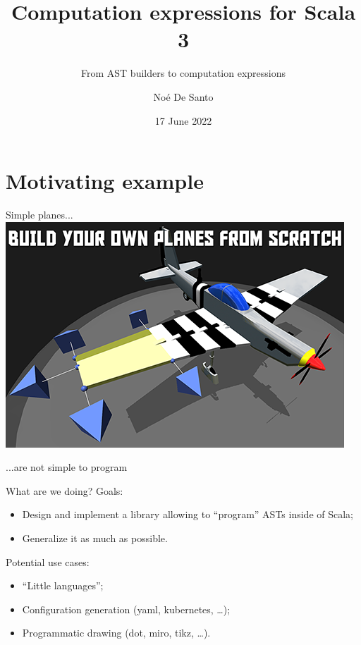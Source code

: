 \documentclass{beamer}
\author{Noé De Santo}
\title{Computation expressions for Scala 3}
\subtitle{From AST builders to computation expressions}
\date{17 June 2022}
\begin{document}
    \maketitle

    \section{Motivating example}

    \begin{frame}{Simple planes...}
        \includegraphics[width=\textwidth]{figs/simple_planes.png}
    \end{frame}

    \begin{frame}{...are not simple to program}
        
        \vspace{2em}
        \pause
        
    \end{frame}

    \begin{frame}{What are we doing?}
        Goals:
        \begin{itemize}
            \item Design and implement a library allowing to ``program'' ASTs inside of Scala;
            \item Generalize it as much as possible.
        \end{itemize}

        \pause
        Potential use cases:
        \begin{itemize}
            \item ``Little languages'';
            \item Configuration generation (yaml, kubernetes, \ldots{});
            \item Programmatic drawing (dot, miro, tikz, \ldots{}).
        \end{itemize}
    \end{frame}
\end{document}
